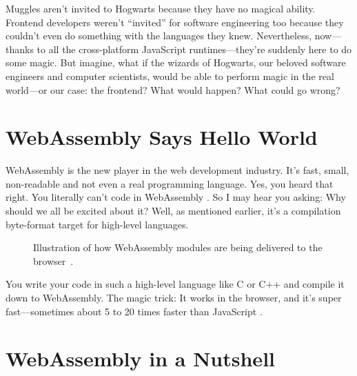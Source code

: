 \documentclass[10pt]{article}  %
\newcommand{\floatcaption}[2]{\caption[#1.]{#1~#2.}}
\begin{document}
\begin{sloppypar}
  Muggles aren’t invited to Hogwarts because they have no magical ability. Frontend developers weren’t “invited” for software engineering too because they couldn’t even do something with the languages they knew. Nevertheless, now—thanks to all the cross-platform JavaScript runtimes—they’re suddenly here to do some magic. But imagine, what if the wizards of Hogwarts, our beloved software engineers and computer scientists, would be able to perform magic in the real world—or our case: the frontend? What would happen? What could go wrong?

  \section{WebAssembly Says Hello World}
  \label{sec:hello-world}

  WebAssembly is the new player in the web development industry. It’s fast, small, non-readable and not even a real programming language. Yes, you heard that right. You literally can’t code in WebAssembly \citep{rourke_learn_2018}. So I may hear you asking: Why should we all be excited about it? Well, as mentioned earlier, it’s a compilation byte-format target for high-level languages.

  \begin{figure}[ht]
    \centering
    \floatcaption{Illustration of how WebAssembly modules are being delivered to the browser}{\citep{logrocket_logrocket_nodate}}
    \label{fig:wasm}
  \end{figure}

  You write your code in such a high-level language like C or C++ and compile it down to WebAssembly. The magic trick: It works in the browser, and it’s super fast—sometimes about 5 to 20 times faster than JavaScript \citep{aboukhalil_how_2019}.

  \section{WebAssembly in a Nutshell}
  \label{sec:wasm-in-a-nutshell}


\end{sloppypar}
\end{document}
